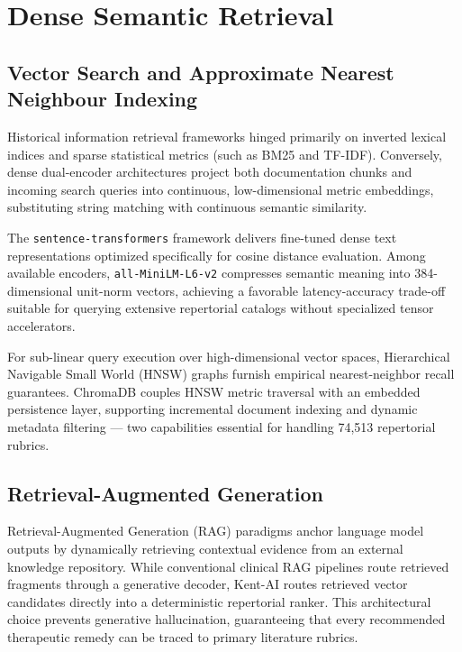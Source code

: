 
\section{Dense Semantic Retrieval}

\subsection{Vector Search and Approximate Nearest Neighbour Indexing}

Historical information retrieval frameworks hinged primarily on inverted lexical indices and sparse statistical metrics (such as BM25 and TF-IDF). Conversely, dense dual-encoder architectures \cite{karpukhin2020dense} project both documentation chunks and incoming search queries into continuous, low-dimensional metric embeddings, substituting string matching with continuous semantic similarity.

The \texttt{sentence-transformers} framework \cite{reimers2019sentence} delivers fine-tuned dense text representations optimized specifically for cosine distance evaluation. Among available encoders, \texttt{all-MiniLM-L6-v2} compresses semantic meaning into 384-dimensional unit-norm vectors, achieving a favorable latency-accuracy trade-off suitable for querying extensive repertorial catalogs without specialized tensor accelerators.

For sub-linear query execution over high-dimensional vector spaces, Hierarchical Navigable Small World (HNSW) graphs \cite{malkov2018efficient} furnish empirical nearest-neighbor recall guarantees. ChromaDB \cite{chromadb2023} couples HNSW metric traversal with an embedded persistence layer, supporting incremental document indexing and dynamic metadata filtering --- two capabilities essential for handling 74,513 repertorial rubrics.

\subsection{Retrieval-Augmented Generation}

Retrieval-Augmented Generation (RAG) paradigms \cite{lewis2020retrieval} anchor language model outputs by dynamically retrieving contextual evidence from an external knowledge repository. While conventional clinical RAG pipelines route retrieved fragments through a generative decoder, Kent-AI routes retrieved vector candidates directly into a deterministic repertorial ranker. This architectural choice prevents generative hallucination, guaranteeing that every recommended therapeutic remedy can be traced to primary literature rubrics.

